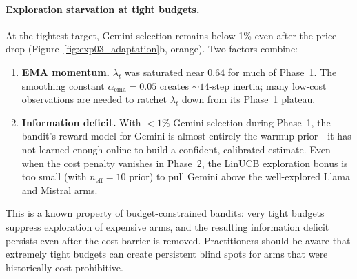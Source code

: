 \paragraph{Exploration starvation at tight budgets.}
At the tightest target, Gemini selection remains below 1\% even
after the price drop (Figure~\ref{fig:exp03_adaptation}b, orange).
Two factors combine:
\begin{enumerate}[nosep,leftmargin=*]
  \item \textbf{EMA momentum.}
    $\lambda_t$ was saturated near $0.64$ for much of
    Phase~1.  The smoothing constant $\alpha_\mathrm{ema}{=}0.05$
    creates ${\sim}14$-step inertia; many low-cost observations are
    needed to ratchet $\lambda_t$ down from its Phase~1 plateau.
  \item \textbf{Information deficit.}
    With $<1\%$ Gemini selection during Phase~1, the bandit's reward
    model for Gemini is almost entirely the warmup prior---it has not
    learned enough online to build a confident, calibrated estimate.
    Even when the cost penalty vanishes in Phase~2, the LinUCB
    exploration bonus is too small (with $n_\mathrm{eff}{=}10$
    prior) to pull Gemini above the well-explored Llama and Mistral
    arms.
\end{enumerate}

\noindent
This is a known property of budget-constrained bandits: very tight
budgets suppress exploration of expensive arms, and the resulting
information deficit persists even after the cost barrier is removed.
Practitioners should be aware that extremely tight budgets can create
persistent blind spots for arms that were historically cost-prohibitive.

